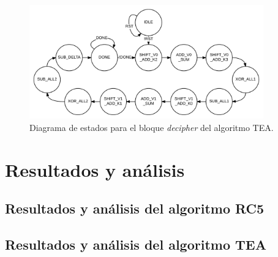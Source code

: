 \begin{figure}
	\centering
	\includegraphics[width=0.9\textwidth]{./images/figDecipherTeaFSM}
	\caption{Diagrama de estados para el bloque \textit{decipher} del algoritmo TEA.}
	\label{figDecipherTeaFSM}
\end{figure}





\chapter{Resultados y análisis}

\section{Resultados y análisis del algoritmo RC5}
\blindtext
\cleardoublepage

\section{Resultados y análisis del algoritmo TEA}
\blindtext
\cleardoublepage

